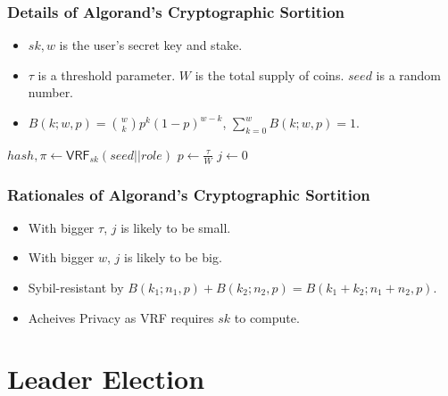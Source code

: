 \documentclass{beamer}
\begin{document}
\begin{frame}
\frametitle{Details of Algorand's Cryptographic Sortition}

\begin{itemize}
    \item $sk, w$ is the user's secret key and stake.
    \item $\tau$ is a threshold parameter. $W$ is the total supply of coins. $seed$ is a random number.
    \item $B(k; w, p) = {w \choose k} p^k (1-p)^{w-k}$, $\sum_{k=0}^w B(k; w, p) = 1$.
\end{itemize}

\begin{algorithm}[H]
    \DontPrintSemicolon
    $hash, \pi \gets \mathsf{VRF}_{sk}(seed || role)$\;
    $p \gets \frac{\tau}{W}$\;
    $j \gets 0$\;
    \While{$\frac{hash}{2^{hashlen}} \notin \left[ \sum_{k=0}^j B(k;w,p), \sum_{k=0}^{j+1} B(k;w,p) \right)$}{
        $j++$\;
    }
    \caption{$\mathsf{Sortition}(sk, seed, \tau, role, w, W)$}
\end{algorithm}

\end{frame}

\begin{frame}
\frametitle{Rationales of Algorand's Cryptographic Sortition}
    
\begin{itemize}
    \item With bigger $\tau$, $j$ is likely to be small.
    \item With bigger $w$, $j$ is likely to be big.
    \item Sybil-resistant by $B(k_1;n_1,p) + B(k_2;n_2,p) = B(k_1 + k_2;n_1 + n_2,p)$.
    \item Acheives Privacy as VRF requires $sk$ to compute.
\end{itemize}

\end{frame}





\section{Leader Election}
\end{document}
